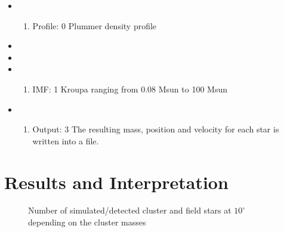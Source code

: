 \documentclass[letterpaper,10pt,english]{sphinxmanual}
\begin{document}
\sphinxAtStartPar
{}
\begin{itemize}
\item {} \begin{enumerate}
%
\setcounter{enumi}{15}
\item {} 
\sphinxAtStartPar
Profile: 0 Plummer density profile

\end{enumerate}

\item {} 

\item {} 

\item {} \begin{enumerate}
%
\setcounter{enumi}{5}
\item {} 
\sphinxAtStartPar
IMF: 1 Kroupa ranging from 0.08 Msun to 100 Msun

\end{enumerate}

\item {} \begin{enumerate}
%
\setcounter{enumi}{2}
\item {} 
\sphinxAtStartPar
Output: 3 The resulting mass, position and velocity for each star is written into a file.

\end{enumerate}

\end{itemize}


\section{Results and Interpretation}
\label{\detokenize{NBodySimulation/Experiments:results-and-interpretation}}
\begin{figure}[htbp]
\centering
\capstart

\noindent{}
\caption{Number of simulated/detected cluster and field stars at \(10^\circ\) depending on the cluster masses}\label{\detokenize{NBodySimulation/Experiments:id3}}\label{\detokenize{NBodySimulation/Experiments:fig-25-n-stars}}\end{figure}
\end{document}
